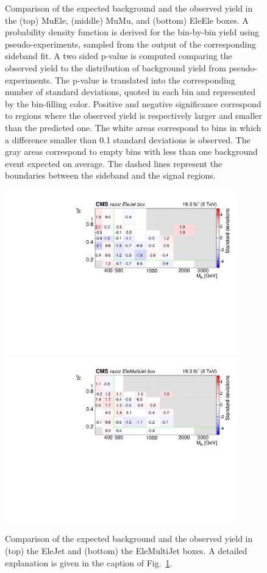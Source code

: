\begin{figure}[tb!]
\caption{Comparison of the expected background and the observed yield
  in the (top) MuEle, (middle) MuMu, and (bottom)
  EleEle boxes. A probability density function is derived for the
  bin-by-bin yield using pseudo-experiments, sampled from the output
  of the corresponding sideband fit. A two sided p-value is computed
  comparing the observed yield to the distribution of background yield
  from pseudo-experiments. The p-value is translated into the
  corresponding number of standard deviations, quoted in each bin and
  represented by the bin-filling color. Positive and negative
  significance correspond to regions where the observed yield is
  respectively larger and smaller than the predicted one. The white areas
  correspond to bins in which a difference smaller than 0.1 standard
  deviations is observed. The gray areas correspond to empty bins with
  less than one background event expected on average. The dashed lines
  represent the boundaries between the sideband and the signal
  regions.\label{fig:FrenchFlagDilep}}

\end{figure}

\begin{figure}[tb!]
\centering
\includegraphics[width=0.9\textwidth]{figs/analysis8TeV/nSigmaLog_EleJet.pdf}
\includegraphics[width=0.9\textwidth]{figs/analysis8TeV/nSigmaLog_EleMultiJet.pdf}
\caption{Comparison of the expected background and the observed yield
  in (top) the EleJet and (bottom) the EleMultiJet boxes. A detailed explanation is given in the caption of
  Fig.~\ref{fig:FrenchFlagDilep}.\label{fig:FrenchFlagEle}}
\end{figure}


